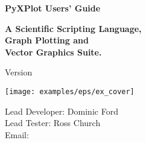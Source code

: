\newcommand{\nlnp} {\\\hspace{8mm}}
\newcommand{\nlscf}{\vspace{3mm}\\\noindent}
\newcommand{\nlfcf}{\vspace{3mm}\\\hspace{8mm}}



\begin{titlepage}
\normalsize
\vspace*{0.5cm}
\begin{center}
{\Huge \bf PyXPlot Users' Guide}\\
\end{center}
\vspace*{0.5cm}
\begin{center}
{\LARGE \bf A Scientific Scripting Language, \\ \vspace{2mm} Graph Plotting and \\ \vspace{2mm} Vector Graphics Suite. \\}
\end{center}
\vspace*{0.5cm}
\begin{center}
{\Large Version \version \\}
\end{center}
\vspace*{0.0cm}
\begin{center}
\texttt{[image: examples/eps/ex\_cover]}
\end{center}
\vspace*{0.2cm}
\begin{center}
{\large
Lead Developer: Dominic Ford \\
\vspace{1mm}
Lead Tester: Ross Church \\ 
\vspace{2mm}
Email:  \\
}
\end{center}
\vspace*{0.5cm}
\begin{center}
{\Large \reldate \\}
\end{center}
\end{titlepage}


